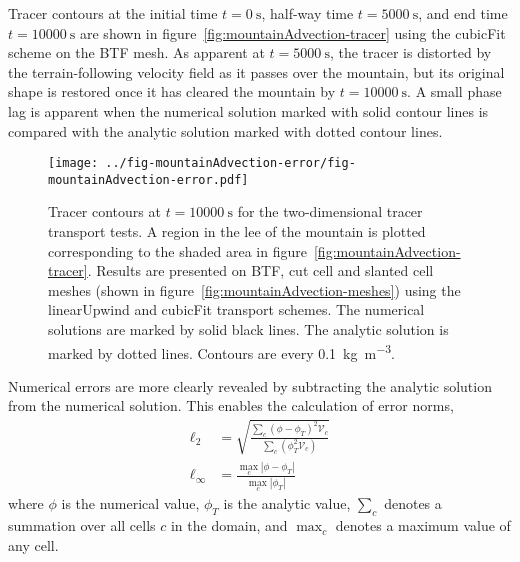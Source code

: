 Tracer contours at the initial time $t=\SI{0}{\second}$, half-way time $t=\SI{5000}{\second}$, and end time $t=\SI{10000}{\second}$ are shown in figure~\ref{fig:mountainAdvection-tracer} using the cubicFit scheme on the BTF mesh.  As apparent at $t=\SI{5000}{\second}$, the tracer is distorted by the terrain-following velocity field as it passes over the mountain, but its original shape is restored once it has cleared the mountain by $t=\SI{10000}{\second}$.
A small phase lag is apparent when the numerical solution marked with solid contour lines is compared with the analytic solution marked with dotted contour lines.

\begin{figure}
	\centering
	\texttt{[image: ../fig-mountainAdvection-error/fig-mountainAdvection-error.pdf]}
	\caption{Tracer contours at $t=\SI{10000}{\second}$ for the two-dimensional tracer transport tests.  A region in the lee of the mountain is plotted corresponding to the shaded area in figure~\ref{fig:mountainAdvection-tracer}.  Results are presented on BTF, cut cell and slanted cell meshes (shown in figure~\ref{fig:mountainAdvection-meshes}) using the linearUpwind and cubicFit transport schemes.  The numerical solutions are marked by solid black lines.  The analytic solution is marked by dotted lines.  Contours are every \SI{0.1}{\kilo\gram\per\meter\cubed}.}
	\label{fig:mountainAdvection-errors}
\end{figure}

Numerical errors are more clearly revealed by subtracting the analytic solution from the numerical solution.  This enables the calculation of error norms,
\begin{align}
	\ell_2 &= \sqrt{\frac{\sum_c \left(\phi - \phi_T \right)^2 \mathcal{V}_c}{\sum_c \left(\phi_T^2 \mathcal{V}_c \right)}} \label{eqn:l2-error} \\
	\ell_\infty &= \frac{\max_c |\phi - \phi_T|}{\max_c |\phi_T|} \label{eqn:linf-error}
\end{align}
where $\phi$ is the numerical value, $\phi_T$ is the analytic value, $\sum_c$ denotes a summation over all cells $c$ in the domain, and $\max_c$ denotes a maximum value of any cell.

